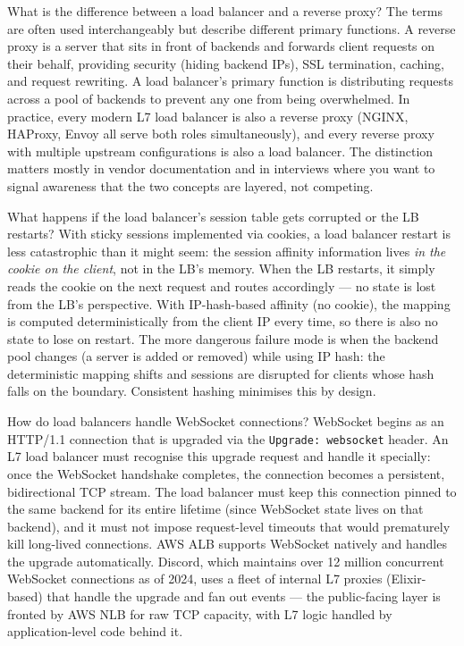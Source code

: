 \documentclass[11pt,a4paper]{article}
\begin{document}
\begin{curiobox}{What is the difference between a load balancer and a reverse proxy?}
  The terms are often used interchangeably but describe different primary functions. A reverse proxy
  is a server that sits in front of backends and forwards client requests on their behalf, providing
  security (hiding backend IPs), SSL termination, caching, and request rewriting. A load balancer's
  primary function is distributing requests across a pool of backends to prevent any one from being
  overwhelmed. In practice, every modern L7 load balancer is also a reverse proxy (NGINX, HAProxy,
  Envoy all serve both roles simultaneously), and every reverse proxy with multiple upstream
  configurations is also a load balancer. The distinction matters mostly in vendor documentation
  and in interviews where you want to signal awareness that the two concepts are layered, not
  competing.
\end{curiobox}

\begin{curiobox}{What happens if the load balancer's session table gets corrupted or the LB restarts?}
  With sticky sessions implemented via cookies, a load balancer restart is less catastrophic than
  it might seem: the session affinity information lives \emph{in the cookie on the client}, not in
  the LB's memory. When the LB restarts, it simply reads the cookie on the next request and routes
  accordingly --- no state is lost from the LB's perspective. With IP-hash-based affinity (no
  cookie), the mapping is computed deterministically from the client IP every time, so there is
  also no state to lose on restart. The more dangerous failure mode is when the backend pool
  changes (a server is added or removed) while using IP hash: the deterministic mapping shifts and
  sessions are disrupted for clients whose hash falls on the boundary. Consistent hashing minimises
  this by design.
\end{curiobox}

\begin{curiobox}{How do load balancers handle WebSocket connections?}
  WebSocket begins as an HTTP/1.1 connection that is upgraded via the \texttt{Upgrade: websocket}
  header. An L7 load balancer must recognise this upgrade request and handle it specially: once
  the WebSocket handshake completes, the connection becomes a persistent, bidirectional TCP
  stream. The load balancer must keep this connection pinned to the same backend for its entire
  lifetime (since WebSocket state lives on that backend), and it must not impose request-level
  timeouts that would prematurely kill long-lived connections. AWS ALB supports WebSocket natively
  and handles the upgrade automatically. Discord, which maintains over 12 million concurrent
  WebSocket connections as of 2024, uses a fleet of internal L7 proxies (Elixir-based) that handle
  the upgrade and fan out events --- the public-facing layer is fronted by AWS NLB for raw TCP
  capacity, with L7 logic handled by application-level code behind it.
\end{curiobox}
\end{document}
